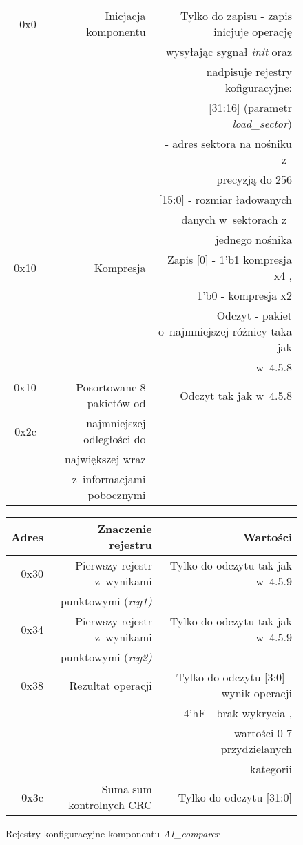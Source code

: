 \begin{figure}[h]
\begin{tabular}{|r|r|r|}
		\hline 
		0x0 & Inicjacja komponentu	   & Tylko do zapisu - zapis inicjuje operację \\
			&						   & wysyłając sygnał \textit{init} oraz \\
			&						   & nadpisuje rejestry kofiguracyjne: \\
			&						   & [31:16] (parametr \textit{load\_sector}) \\ 
			&						   & - adres sektora na nośniku z~\\
			&						   & precyzją do 256 \\
			&						   & [15:0] - rozmiar ładowanych \\ 
			&						   &  danych w~sektorach z~\\
			&						   & jednego nośnika\\
			\hline
		0x10& Kompresja				   & Zapis [0] - 1'b1 kompresja x4 , \\
			&						   & 1'b0 - kompresja x2 \\
		&						   & Odczyt - pakiet o~najmniejszej różnicy	taka jak \\
		&						   & w~4.5.8 \\
		\hline
		0x10 - & Posortowane 8 pakietów od  & Odczyt tak jak w~4.5.8\\
		0x2c & najmniejszej odległości do & \\
		& największej wraz  & \\
		& z~informacjami pobocznymi					 & \\

		\hline
	\end{tabular}
 \end{figure}
\FloatBarrier %

 \begin{figure}[h]
	\centering
	\begin{tabular}{|r|r|r|}
		\hline
		Adres & Znaczenie rejestru & Wartości \\
				\hline
		0x30 & Pierwszy rejestr z~wynikami  & Tylko do odczytu tak jak w~4.5.9\\
		& punktowymi (\textit{reg1)}	& \\
		\hline

		
		0x34 & Pierwszy rejestr z~wynikami  & Tylko do odczytu tak jak w~4.5.9\\
		& punktowymi (\textit{reg2)}	& \\
		\hline
		0x38 & Rezultat operacji		& Tylko do odczytu [3:0] - wynik operacji \\
			 & 							& 4'hF - brak wykrycia , \\
			 &							& wartości 0-7 przydzielanych \\
			 &							& kategorii \\
		\hline
		0x3c & Suma sum kontrolnych CRC & Tylko do odczytu [31:0] \\
		\hline
	\end{tabular}
	
	\caption{Rejestry konfiguracyjne komponentu \textit{AI\_comparer}}
\end{figure}
\FloatBarrier %

